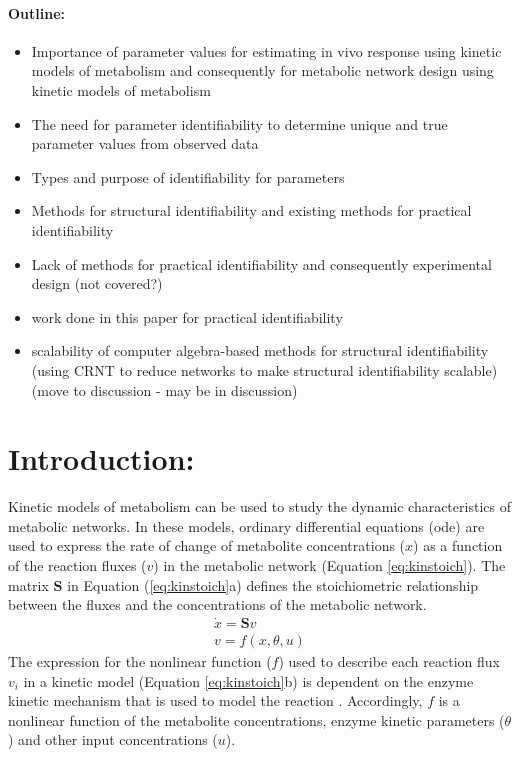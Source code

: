 \documentclass[10pt]{article}
\begin{document}
\paragraph{Outline:}
\begin{itemize}
	\item Importance of parameter values for estimating in vivo response using kinetic models of metabolism and consequently for metabolic network design using kinetic models of metabolism
	\item The need for parameter identifiability to determine unique and true parameter values from observed data
	\item Types and purpose of identifiability for parameters
	\item Methods for structural identifiability and existing methods for practical identifiability
	\item Lack of methods for practical identifiability and consequently experimental design (not covered?)
	\item work done in this paper for practical identifiability			
	\item scalability of computer algebra-based methods for structural identifiability (using CRNT to reduce networks to make structural identifiability scalable) (move to discussion - may be in discussion)
\end{itemize}
\section{Introduction:}
Kinetic models of metabolism can be used to study the dynamic characteristics of metabolic networks. In these models, ordinary differential equations (ode) are used to express the rate of change of metabolite concentrations ($x$) as a function of the reaction fluxes ($v$) in the metabolic network (Equation \ref{eq:kinstoich}). The matrix $\mathbf{S}$ in Equation (\ref{eq:kinstoich}a) defines the stoichiometric relationship between the fluxes and the concentrations of the metabolic network.
\begin{subequations}\label{eq:kinstoich}
	\begin{align}
	\dot{x} = \mathbf{S}v\\
	v = f(x, \theta, u)
	\end{align}
\end{subequations}
The expression for the nonlinear function ($f$) used to describe each reaction flux $v_i$ in a kinetic model (Equation \ref{eq:kinstoich}b) is dependent on the enzyme kinetic mechanism that is used to model the reaction \parencite{Heijnen2005, Link2014, Machado2011, Srinivasan2015}. Accordingly, $f$ is a nonlinear function of the metabolite concentrations, enzyme kinetic parameters ($\theta$) and other input concentrations ($u$). 
\end{document}
